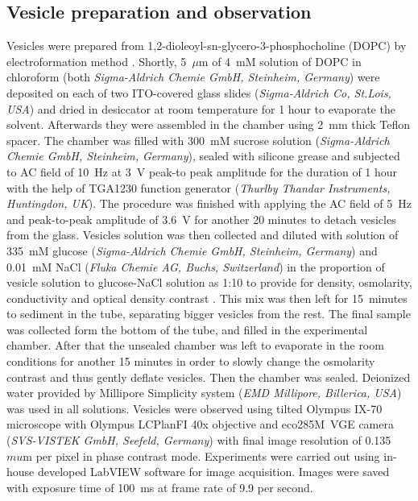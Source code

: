 \documentclass[10pt,a4paper,draft]{article}
\begin{document}
\subsection{Vesicle preparation and observation}
Vesicles were prepared from 1,2-dioleoyl-sn-glycero-3-phosphocholine \newline (DOPC) by electroformation method \cite{Angelova1986}.
Shortly, 5~$\mu$m of 4~mM solution of DOPC in chloroform (both \emph{Sigma-Aldrich Chemie GmbH, Steinheim, Germany}) were deposited on each of two ITO-covered glass slides (\emph{Sigma-Aldrich Co, St.Lois, USA}) and dried in desiccator at room temperature for 1 hour to evaporate the solvent.
Afterwards they were assembled in the chamber using 2~mm thick Teflon spacer.
The chamber was filled with 300~mM sucrose solution (\emph{Sigma-Aldrich Chemie GmbH, Steinheim, Germany}), sealed with silicone grease and subjected to AC field of 10~Hz at 3~V peak-to peak amplitude for the duration of 1 hour with the help of TGA1230 function generator (\emph{Thurlby Thandar Instruments, Huntingdon, UK}).
The procedure was finished with applying the AC field of 5~Hz and peak-to-peak amplitude of 3.6~V for another 20 minutes to detach vesicles from the glass.
Vesicles solution was then collected and diluted with solution of 335~mM glucose (\emph{Sigma-Aldrich Chemie GmbH, Steinheim, Germany}) and 0.01~mM NaCl (\emph{Fluka Chemie AG, Buchs, Switzerland}) in the proportion of vesicle solution to glucose-NaCl solution as 1:10 to provide for density, osmolarity, conductivity and optical density contrast .
This mix was then left for 15~minutes to sediment in the tube, separating bigger vesicles from the rest.
The final sample was collected form the bottom of the tube, and filled in the experimental chamber.
After that the unsealed chamber was left to evaporate in the room conditions for another 15 minutes in order to slowly change the osmolarity contrast and thus gently deflate vesicles.
Then the chamber was sealed.
Deionized water provided by Millipore Simplicity system (\emph{EMD Millipore, Billerica, USA}) was used in all solutions.
Vesicles were observed using tilted Olympus IX-70 microscope with Olympus LCPlanFI 40x objective and eco285M~VGE camera (\emph{SVS-VISTEK GmbH, Seefeld, Germany}) with final image resolution of 0.135~$mu$m per pixel in phase contrast mode. Experiments were carried out using in-house developed LabVIEW software for image acquisition. Images were saved with exposure time of 100~ms at frame rate of 9.9 per second.
\end{document}
